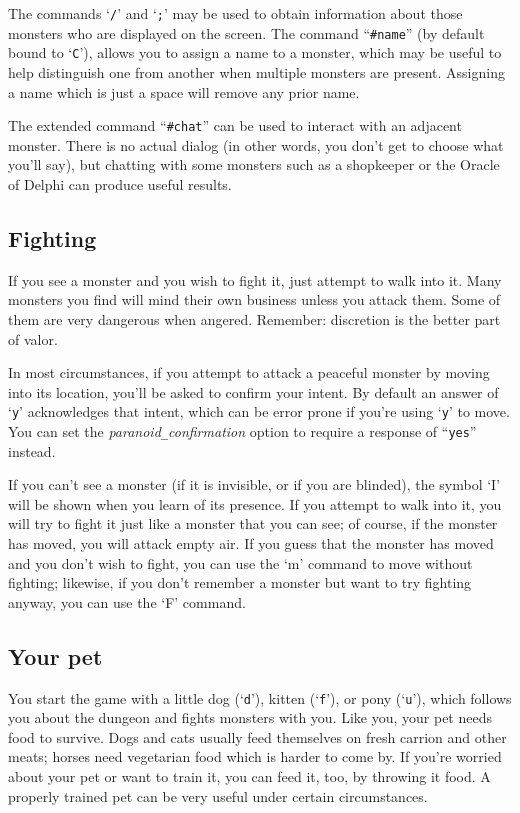 The commands `{\tt /}' and `{\tt ;}' may be used to obtain information
about those
monsters who are displayed on the screen.  The command ``{\tt \#name}''
(by default bound to `{\tt C}'), allows you
to assign a name to a monster, which may be useful to help distinguish
one from another when multiple monsters are present.  Assigning a name
which is just a space will remove any prior name.

The extended command ``{\tt \#chat}'' can be used to interact with an adjacent
monster.  There is no actual dialog (in other words, you don't get to
choose what you'll say), but chatting with some monsters such as a
shopkeeper or the Oracle of Delphi can produce useful results.

\subsection*{Fighting}

If you see a monster and you wish to fight it, just attempt to walk
into it.  Many monsters you find will mind their own business unless
you attack them.  Some of them are very dangerous when angered.
Remember:  discretion is the better part of valor.

In most circumstances, if you attempt to attack a peaceful monster by
moving into its location, you'll be asked to confirm your intent.  By
default an answer of `{\tt y}' acknowledges that intent,
which can be error prone if you're using `{\tt y}' to move.  You can set the
{\it paranoid\verb+_+confirmation\/}
option to require a response of ``{\tt yes}'' instead.

If you can't see a monster (if it is invisible, or if you are blinded),
the symbol `I' will be shown when you learn of its presence.
If you attempt to walk into it, you will try to fight it just like
a monster that you can see; of course,
if the monster has moved, you will attack empty air.  If you guess
that the monster has moved and you don't wish to fight, you can use the `m'
command to move without fighting; likewise, if you don't remember a monster
but want to try fighting anyway, you can use the `F' command.

\subsection*{Your pet}

You start the game with a little dog (`{\tt d}'), kitten (`{\tt f}'),
or pony (`{\tt u}'), which follows
you about the dungeon and fights monsters with you.
Like you, your pet needs food to survive.
Dogs and cats usually feed themselves on fresh carrion and other meats;
horses need vegetarian food which is harder to come by.
If you're worried about your pet or want to train it, you
can feed it, too, by throwing it food.
A properly trained pet can be very useful under certain circumstances.

